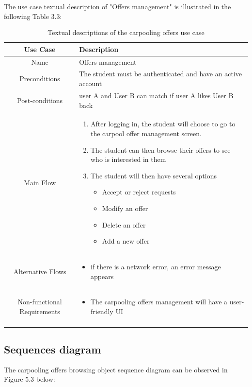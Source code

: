 The use case textual description of "Offers management" is illustrated in the
following Table 3.3:

\begin{longtable}{|c|p{10cm}|}
\hline
Use Case & Description \\\hline
Name & Offers management \\\hline
Preconditions & The student must be authenticated and have an active
account \\\hline
Post-conditions & user A and User B can match if user A likes User B back
\\\hline
Main Flow &
\begin{enumerate}
    \item After logging in, the student will choose to go to the carpool offer management screen.
    \item The student can then browse their offers to see who is interested in them
    \item The student will then have several options
       \begin{itemize}
        \item Accept or reject requests
        \item Modify an offer
        \item Delete an offer
        \item Add a new offer
    \end{itemize} 
\end{enumerate}
\\\hline
Alternative Flows & \begin{itemize}
    \item if there is a network error, an error message appears
\end{itemize}
\\\hline
Non-functional Requirements & \begin{itemize}
    \item The carpooling offers management will have a user-friendly UI
\end{itemize}
\\\hline
\caption{Textual descriptions of the carpooling offers use case}
\label{Tab: Textual descriptions of the carpooling offers use case}
\end{longtable}

\subsection{Sequences diagram}
The carpooling offers browsing object sequence diagram can be observed in Figure 5.3 below:

